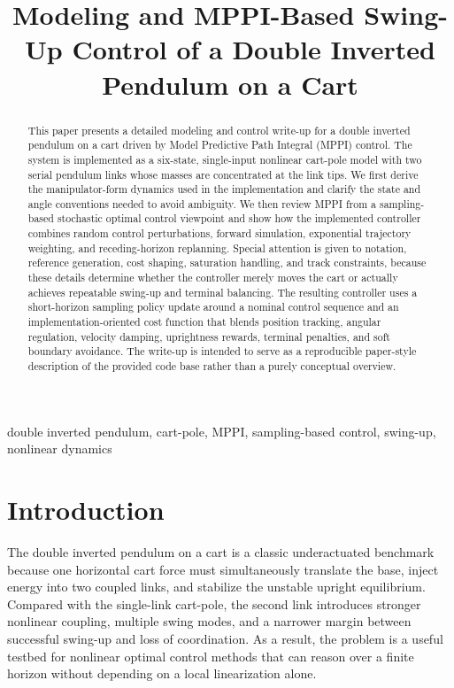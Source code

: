 \documentclass[conference]{IEEEtran}
\title{Modeling and MPPI-Based Swing-Up Control of a Double Inverted Pendulum on a Cart}
\author{
\IEEEauthorblockN{Author Name}
\IEEEauthorblockA{Department of Mechanical and Aerospace Engineering\\
Course Project Report}
}
\begin{document}
\maketitle

\begin{abstract}
This paper presents a detailed modeling and control write-up for a double inverted pendulum on a cart driven by Model Predictive Path Integral (MPPI) control. The system is implemented as a six-state, single-input nonlinear cart-pole model with two serial pendulum links whose masses are concentrated at the link tips. We first derive the manipulator-form dynamics used in the implementation and clarify the state and angle conventions needed to avoid ambiguity. We then review MPPI from a sampling-based stochastic optimal control viewpoint and show how the implemented controller combines random control perturbations, forward simulation, exponential trajectory weighting, and receding-horizon replanning. Special attention is given to notation, reference generation, cost shaping, saturation handling, and track constraints, because these details determine whether the controller merely moves the cart or actually achieves repeatable swing-up and terminal balancing. The resulting controller uses a short-horizon sampling policy update around a nominal control sequence and an implementation-oriented cost function that blends position tracking, angular regulation, velocity damping, uprightness rewards, terminal penalties, and soft boundary avoidance. The write-up is intended to serve as a reproducible paper-style description of the provided code base rather than a purely conceptual overview.
\end{abstract}

\begin{IEEEkeywords}
double inverted pendulum, cart-pole, MPPI, sampling-based control, swing-up, nonlinear dynamics
\end{IEEEkeywords}

\section{Introduction}
The double inverted pendulum on a cart is a classic underactuated benchmark because one horizontal cart force must simultaneously translate the base, inject energy into two coupled links, and stabilize the unstable upright equilibrium. Compared with the single-link cart-pole, the second link introduces stronger nonlinear coupling, multiple swing modes, and a narrower margin between successful swing-up and loss of coordination. As a result, the problem is a useful testbed for nonlinear optimal control methods that can reason over a finite horizon without depending on a local linearization alone.
\end{document}
